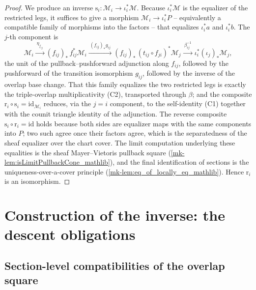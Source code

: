 \begin{proof}
  We produce an inverse \(\mathrm{s}_i : \mathcal{M}_i \to \iota_i^{*}\mathcal{M}\).
  Because \(\iota_i^{*}\mathcal{M}\) is the equalizer of the restricted legs, it
  suffices to give a morphism \(\mathcal{M}_i \to \iota_i^{*}P\) -- equivalently a
  compatible family of morphisms into the factors -- that equalizes
  \(\iota_i^{*}a\) and \(\iota_i^{*}b\). The \(j\)-th component is
  \[
    \mathcal{M}_i
      \xrightarrow{\ \eta_{f_{ij}}\ }
    (f_{ij})_{*}\,f_{ij}^{*}\mathcal{M}_i
      \xrightarrow{\ (f_{ij})_{*} g_{ij}\ }
    (f_{ij})_{*}\,(t_{ij} \circ f_{ji})^{*}\mathcal{M}_j
      \xrightarrow{\ \beta_{ij}^{-1}\ }
    \iota_i^{*}(\iota_j)_{*}\mathcal{M}_j ,
  \]
  the unit of the pullback--pushforward adjunction along \(f_{ij}\), followed by the
  pushforward of the transition isomorphism \(g_{ij}\), followed by the inverse of the
  overlap base change. That this family equalizes the two restricted legs is exactly
  the triple-overlap multiplicativity (C2), transported through \(\beta\); and the
  composite \(\mathrm{r}_i \circ \mathrm{s}_i = \mathrm{id}_{\mathcal{M}_i}\) reduces,
  via the \(j = i\) component, to the self-identity (C1) together with the counit
  triangle identity of the adjunction. The reverse composite
  \(\mathrm{s}_i \circ \mathrm{r}_i = \mathrm{id}\) holds because both sides are
  equalizer maps with the same components into \(P\); two such agree once their
  factors agree, which is the separatedness of the sheaf equalizer over the chart
  cover. The limit computation underlying these equalities is the sheaf
  Mayer--Vietoris pullback square (\ref{mk-lem:isLimitPullbackCone_mathlib}), and the
  final identification of sections is the uniqueness-over-a-cover principle
  (\ref{mk-lem:eq_of_locally_eq_mathlib}). Hence \(\mathrm{r}_i\) is an isomorphism.
\end{proof}

\section{Construction of the inverse: the descent obligations}
\label{mk-sec:gd_inverse}


\subsection{Section-level compatibilities of the overlap square}

